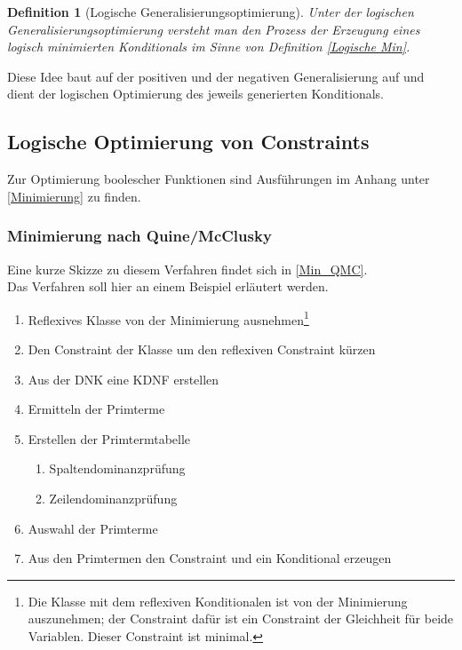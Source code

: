 \documentclass[a4paper, 11pt]{book}
\newtheorem{Def}{Definition }[section]
\begin{document}
\begin{Def}[Logische Generalisierungsoptimierung]\label{Logische Genopt}
	Unter der logischen Generalisierungsoptimierung versteht man den Prozess der Erzeugung eines logisch minimierten Konditionals im Sinne von Definition \ref{Logische Min}.
\end{Def}
Diese Idee baut auf der positiven und der negativen Generalisierung auf und dient der logischen Optimierung des jeweils generierten Konditionals.

\subsection{Logische Optimierung von Constraints} \label{LogOpt}
Zur Optimierung boolescher Funktionen sind Ausführungen im Anhang unter \ref{Minimierung} zu finden.
\subsubsection{Minimierung nach Quine/McClusky} \label{Min_Besch_QMC} 
Eine kurze Skizze zu diesem Verfahren findet sich in \ref{Min_QMC}.\\
Das Verfahren soll hier an einem Beispiel erläutert werden.
\begin{enumerate}
	\item Reflexives Klasse von der Minimierung ausnehmen\footnote{Die Klasse mit dem reflexiven Konditionalen ist von der Minimierung auszunehmen; der Constraint dafür ist ein Constraint der Gleichheit für beide Variablen. Dieser Constraint ist minimal.}
	\item Den Constraint der Klasse um den reflexiven Constraint kürzen
	\item Aus der DNK eine KDNF erstellen 
	\item Ermitteln der Primterme
	\item Erstellen der Primtermtabelle
	\begin{enumerate}
		\item Spaltendominanzprüfung
		\item Zeilendominanzprüfung
	\end{enumerate}
	\item Auswahl der Primterme
	\item Aus den Primtermen den Constraint und ein Konditional erzeugen	
\end{enumerate}
\end{document}
